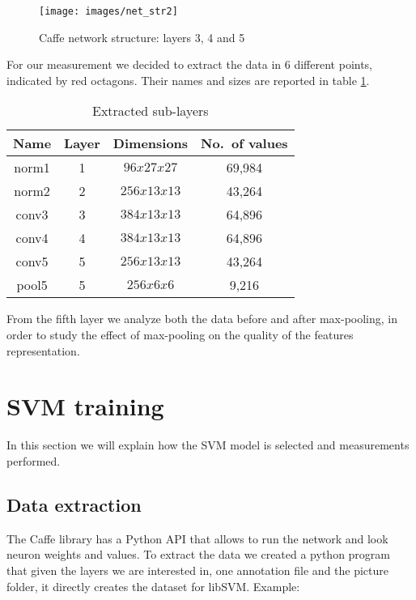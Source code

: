 \begin{figure}[h!]\centering
    \texttt{[image: images/net\_str2]}
    \caption{Caffe network structure: layers 3, 4 and 5}
    \label{fig:net_str2}
\end{figure}

For our measurement we decided to extract the data in 6 different points,
indicated by red octagons. Their names and sizes are reported in table
\ref{table:layers}.

\begin{table}[htbp]
\caption{Extracted sub-layers}
\centering
\begin{tabular}{c|ccc}
    Name  & Layer & Dimensions & No.~of values \\
    \midrule
    norm1 & 1 & $96x27x27$ & 69,984\\
    norm2 & 2 & $256x13x13$ & 43,264\\
    conv3 & 3 & $384x13x13$ & 64,896\\
    conv4 & 4 & $384x13x13$ & 64,896\\
    conv5 & 5 & $256x13x13$ & 43,264\\
    pool5 & 5 & $256x6x6$ & 9,216\\
\end{tabular}
\label{table:layers}
\end{table}

From the fifth layer we analyze both the data before and after max-pooling, in
order to study the effect of max-pooling on the quality of the features
representation.

\section{SVM training}

In this section we will explain how the SVM model is selected and measurements
performed.

\subsection{Data extraction} \label{subsec:svm_input}

The Caffe library has a Python API that allows to run the network and look
neuron weights and values. To extract the data we created a python program that
given the layers we are interested in, one annotation file and the picture
folder, it directly creates the dataset for libSVM. Example:

